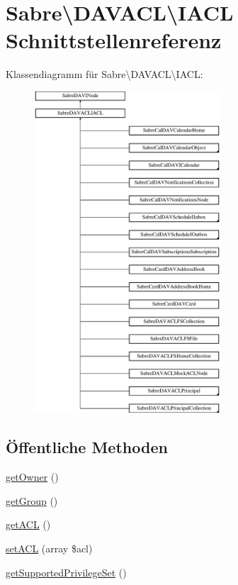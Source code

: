 \hypertarget{interface_sabre_1_1_d_a_v_a_c_l_1_1_i_a_c_l}{}\section{Sabre\textbackslash{}D\+A\+V\+A\+CL\textbackslash{}I\+A\+CL Schnittstellenreferenz}
\label{interface_sabre_1_1_d_a_v_a_c_l_1_1_i_a_c_l}
Klassendiagramm für Sabre\textbackslash{}D\+A\+V\+A\+CL\textbackslash{}I\+A\+CL\+:\begin{figure}[H]
\begin{center}
\leavevmode
\includegraphics[height=12.000000cm]{interface_sabre_1_1_d_a_v_a_c_l_1_1_i_a_c_l}
\end{center}
\end{figure}
\subsection*{Öffentliche Methoden}
\begin{DoxyCompactItemize}
\item 
\mbox{\hyperlink{interface_sabre_1_1_d_a_v_a_c_l_1_1_i_a_c_l_a05f531b4ae1a86eab4e6e95b0413390e}{get\+Owner}} ()
\item 
\mbox{\hyperlink{interface_sabre_1_1_d_a_v_a_c_l_1_1_i_a_c_l_a8ba38d5a99d771d7ae2719dd483515f6}{get\+Group}} ()
\item 
\mbox{\hyperlink{interface_sabre_1_1_d_a_v_a_c_l_1_1_i_a_c_l_a8fe3b3a5b48eae789d7eb722b340045c}{get\+A\+CL}} ()
\item 
\mbox{\hyperlink{interface_sabre_1_1_d_a_v_a_c_l_1_1_i_a_c_l_a95e96725db02aae734ce5e7fbb438174}{set\+A\+CL}} (array \$acl)
\item 
\mbox{\hyperlink{interface_sabre_1_1_d_a_v_a_c_l_1_1_i_a_c_l_a9db850218d4002ed21bbd87665e0c614}{get\+Supported\+Privilege\+Set}} ()
\end{DoxyCompactItemize}


